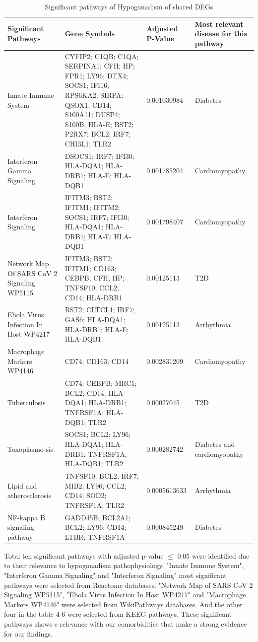 \begin{longtable}{|p{2cm}|p{5cm}|p{2cm}|p{4cm}|}
    \caption[Significant pathways of Hypogonadism of shared DEGs]{Significant pathways of Hypogonadism of shared DEGs}\label{tab:significant_pathways_hypogonadism} \\
    \hline
    Significant Pathways & Gene Symbols & Adjusted P-Value & Most relevant disease for this pathway \\
    \hline
    Innate Immune System & CYFIP2; C1QB; C1QA;  SERPINA1;  CFH; HP; FPR1; LY96; DTX4;  SOCS1; IFI16; RPS6KA2; SIRPA;  QSOX1; CD14; S100A11;  DUSP4; S100B; HLA-E; BST2; P2RX7; BCL2; IRF7;  CHI3L1; TLR2 & 0.001030984 & Diabetes \\
    \hline
    Interferon Gamma Signaling & DSOCS1; IRF7; IFI30; HLA-DQA1; HLA-DRB1; HLA-E; HLA-DQB1 & 0.001785204 & Cardiomyopathy \\
    \hline
    Interferon Signaling & IFITM3; BST2; IFITM1; IFITM2;  SOCS1; IRF7; IFI30; HLA-DQA1; HLA-DRB1; HLA-E; HLA-DQB1 & 0.001798407 & Cardiomyopathy \\
    \hline
    Network Map Of SARS CoV 2 Signaling WP5115 & IFITM3; BST2; IFITM1;  CD163; CEBPB; CFH; HP;  TNFSF10;  CCL2;  CD14; HLA-DRB1 & 0.00125113 & T2D \\
    \hline
    Ebola Virus Infection In Host WP4217 & BST2; CLTCL1; IRF7; GAS6; HLA-DQA1; HLA-DRB1; HLA-E; HLA-DQB1 & 0.00125113 & Arrhythmia \\
    \hline
    Macrophage Markers WP4146 & CD74; CD163; CD14 & 0.002831209 & Cardiomyopathy \\
    \hline
    Tuberculosis & CD74; CEBPB; MRC1; BCL2;  CD14; HLA-DQA1; HLA-DRB1; TNFRSF1A; HLA-DQB1; TLR2 & 0.00027045 & T2D \\
    \hline
    Toxoplasmo-sis & SOCS1; BCL2; LY96; HLA-DQA1; HLA-DRB1; TNFRSF1A; HLA-DQB1; TLR2 & 0.000282742 & Diabetes and cardiomyopathy \\
    \hline
    Lipid and atherosclerosis & TNFSF10; BCL2; IRF7; MIB2;  LY96; CCL2; CD14; SOD2;  TNFRSF1A; TLR2 & 0.0005613633 & Arrhythmia \\
    \hline
    NF-kappa B signaling pathway & GADD45B; BCL2A1; BCL2;  LY96; CD14; LTBR; TNFRSF1A & 0.000845249 & Diabetes \\
    \hline
\end{longtable}

Total ten significant pathways with adjusted p-value $\leq$ 0.05 were identified due to their relevance to hypogonadism pathophysiology. "Innate Immune System", "Interferon Gamma Signaling" and "Interferon Signaling" most significant pathways were selected from Reactome databases. "Network Map of SARS CoV 2 Signaling WP5115", "Ebola Virus Infection In Host WP4217" and "Macrophage Markers WP4146" were selected from WikiPathways databases. And the other four in the table 4-6 were selected from KEEG pathways. These significant pathways shows e relevance with our comorbidities that make a strong evidence for our findings.\\

